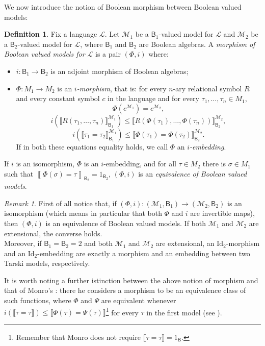 \documentclass[11pt]{amsart}
\newcommand{\LL}{\mathcal{L}}
\newcommand{\Id}{\textrm{Id}}
\theoremstyle{plain}
\theoremstyle{definition}
\newtheorem{definition}[theorem]{Definition}
\theoremstyle{plain}
\theoremstyle{remark}
\newtheorem{remark}[theorem]{Remark}
\newcommand{\M}{\mathcal{M}}
\DeclareMathOperator{\RO}{\mathsf{RO}}
\newcommand{\bool}[1]{\mathsf{#1}}
\newcommand{\cp}[1]{\left( #1 \right)}
\newcommand{\Qp}[1]{\left\llbracket #1 \right\rrbracket}
\newcommand{\0}{\mathsf{0}}
\renewcommand{\1}{\mathsf{1}}
\renewcommand{\2}{\mathsf{2}}
\theoremstyle{definition}
\begin{document}
We now introduce the notion of Boolean morphism between Boolean valued models:
\begin{definition}\label{def:boolvalmorph}
Fix a language $\LL$. Let $\M_1$ be a $\bool{B}_1$-valued model for $\LL$ and $\M_2$ be a $\bool{B}_2$-valued model for $\LL$, where $\bool{B}_1$ and $\bool{B}_2$ are Boolean algebras. A \emph{morphism of Boolean valued models for $\LL$} is a pair $(\Phi, i)$ where:
\begin{itemize}
\item $i: \bool{B}_1\to \bool{B}_2$ is an adjoint morphism of Boolean algebras; 
\item $\Phi:M_1\to M_2$ is an \emph{$i$-morphism}, that is: for every $n$-ary relational symbol $R$ and every constant symbol $c$ in the language and for every 
$\tau_1,\dots, \tau_n\in M_1$, 
\[\Phi(c^{\M_1})=c^{\M_2},\]
\[ i(\llbracket R(\tau_1, \dots, \tau_n)\rrbracket^{\M_1}_{\bool{B}_1})\leq 
\llbracket R(\Phi(\tau_1), \dots, \Phi(\tau_n))\rrbracket^{\M_2}_{\bool{B}_2},\] 
\[ i(\llbracket \tau_1=\tau_2\rrbracket^{\M_1}_{\bool{B}_1})\leq \llbracket\Phi(\tau_1)=\Phi(\tau_2)\rrbracket^{\M_2}_{\bool{B}_2}.\]
If in both these equations equality holds, we call $\Phi$ an \emph{$i$-embedding}.\end{itemize}
If $i$ is an isomorphism, $\Phi$ is an $i$-embedding, and for all $\tau\in M_2$ there is $\sigma\in M_1$ such that 
$\Qp{\Phi(\sigma)=\tau}_{\bool{B}_2}=1_{\bool{B}_2}$, $\cp{\Phi,i}$ is an \emph{equivalence of Boolean valued models}.
\end{definition}
\begin{remark}
First of all notice that, if $(\Phi, i):(\M_1, \bool{B}_1)\to(\M_2, \bool{B}_2)$ is an isomorphism (which means in particular that both $\Phi$ and $i$ are invertible maps), then $(\Phi, i)$ is an equivalence of Boolean valued models. If both $\M_1$ and $\M_2$ are extensional, the converse holds.\\
Moreover, if $\bool{B}_1=\bool{B}_2=2$ and both $\M_1$ and $\M_2$ are extensional, an $\Id_2$-morphism and an $\Id_2$-embedding are exactly a morphism and an embedding between two
Tarski models, respectively.
\end{remark}
It is worth noting a further istinction between the above notion of morphism and that of Monro's \cite{MONRO86}: there he considers a morphism to be an equivalence class of such functions, where $\Phi$ and $\Psi$ are equivalent whenever $i(\llbracket\tau=\tau\rrbracket)\leq\llbracket\Phi(\tau)=\Psi(\tau)\rrbracket$\footnote{Remember that Monro does not require $\llbracket\tau=\tau\rrbracket=1_{\bool{B}}$.} for every $\tau$ in the first model (see \cite[Definition 5.2]{MONRO86}).
\end{document}
